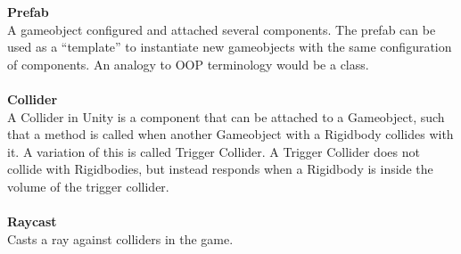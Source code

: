 \textbf{Prefab}\vspace{4pt}\\
A gameobject configured and attached several components. The prefab can be used as a ``template'' to instantiate new gameobjects with the same configuration of components.
An analogy to OOP terminology would be a class.\\
\\
\textbf{Collider}\vspace{4pt}\\
A Collider in Unity is a component that can be attached to a Gameobject, such that a method is called when another Gameobject with a Rigidbody\cite{rigidbody} collides with it.\cite{collider2d}
A variation of this is called Trigger Collider.
A Trigger Collider does not collide with Rigidbodies, but instead responds when a Rigidbody is inside the volume of the trigger collider.\cite{collider2dtrigger}\\
\\
\textbf{Raycast}\vspace{4pt}\\
Casts a ray against colliders in the game. \cite{raycast}\\
\\

